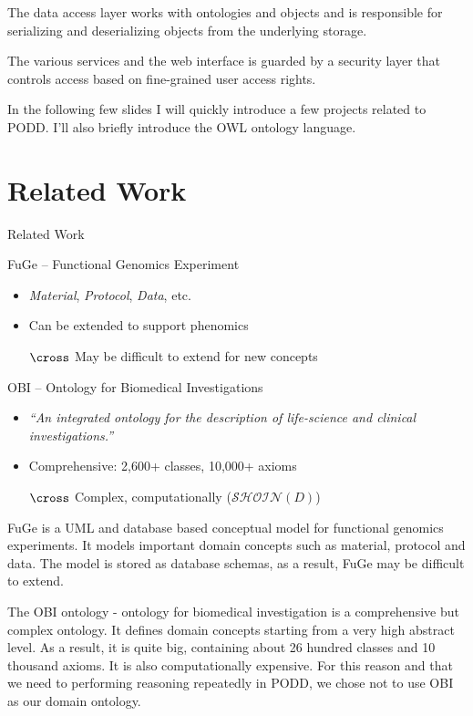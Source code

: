\documentclass[ignorenonframetext,compress]{beamer}
\begin{document}
The data access layer works with ontologies and objects and is
responsible for serializing and deserializing objects from the
underlying storage.

The various services and the web interface is guarded by a security
layer that controls access based on fine-grained user access rights.

In the following few slides I will quickly introduce a few projects
related to PODD. I'll also briefly introduce the OWL ontology
language.

\section{Related Work}
\begin{frame}{Related Work}
\begin{block}{FuGe -- Functional Genomics Experiment}
    \begin{itemize}
        \item \emph{Material}, \emph{Protocol}, \emph{Data}, etc.
        \item Can be extended to support phenomics
        \item[$\cross$] May be difficult to extend for new concepts
    \end{itemize}
\end{block}
\pause
\begin{block}{OBI -- Ontology for Biomedical Investigations}
    \begin{itemize}
        \item \textit{``An integrated ontology for the description of life-science and clinical
        investigations.''}
        \item Comprehensive: 2,600+ classes, 10,000+ axioms
        \item[$\cross$] Complex, computationally ($\mathcal{SHOIN}(D)$)
    \end{itemize}
\end{block}
\end{frame}

FuGe is a UML and database based conceptual model for functional
genomics experiments. It models important domain concepts such as
material, protocol and data. The model is stored as database
schemas, as a result, FuGe may be difficult to extend.

The OBI ontology - ontology for biomedical investigation is a
comprehensive but complex ontology. It defines domain concepts 
starting from a very high abstract level. As a result, it is 
quite big, containing about 26 hundred classes and 10 thousand
axioms. It is also computationally expensive. For this reason and
that we need to performing reasoning repeatedly in PODD, we chose
not to use OBI as our domain ontology. 
\end{document}
